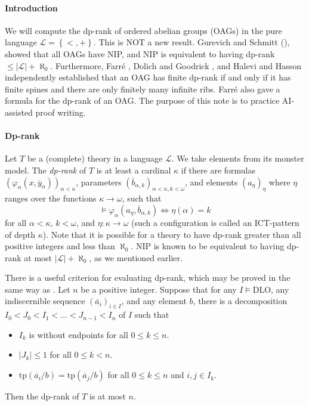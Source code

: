 \documentclass{article}
\title{}
\author{}
\date{}
\theoremstyle{definition}
\theoremstyle{remark}
\theoremstyle{plain}
\begin{document}


\paragraph{Introduction}

We will compute the dp-rank of ordered abelian groups (OAGs) in the pure language $\mathcal{L} = \left\{ <,+ \right\}$.
This is NOT a new result.
Gurevich and Schmitt (\cite{Gurevich1984TheOrd}), showed that all OAGs have NIP, and NIP is equivalent to having dp-rank $\leq |\mathcal{L}| + \aleph_0$.
Furthermore, Farré \cite{Farre2017StrOrd}, Dolich and Goodrick \cite{Dolich2018ChaStr}, and Halevi and Hasson \cite{Halevi2019StrDep} independently established that an OAG has finite dp-rank if and only if it has finite spines and there are only finitely many infinite ribs.
Farré also gave a formula for the dp-rank of an OAG.
The purpose of this note is to practice AI-assisted proof writing.

\paragraph{Dp-rank}

Let $T$ be a (complete) theory in a language $\mathcal{L}$.
We take elements from its monster model.
The \emph{dp-rank} of $T$ is at least a cardinal $\kappa$ if there are formulas $(\varphi_{\alpha}(x,\overline{y}_{\alpha}))_{\alpha < \kappa}$, parameters $(\overline{b}_{\alpha, k})_{\alpha < \kappa, k < \omega}$, and elements $(a_{\eta})_{\eta}$ where $\eta
$ ranges over the functions $\kappa \to \omega$, such that
\begin{equation*}
	\models \varphi_{\alpha}(a_{\eta}, \overline{b}_{\alpha, k}) \iff \eta(\alpha) = k
\end{equation*}
for all $\alpha < \kappa$, $k < \omega$, and $\eta: \kappa \to \omega$ (such a configuration is called an ICT-pattern of depth $\kappa$).
Note that it is possible for a theory to have dp-rank greater than all positive integers and less than $\aleph_0$.
NIP is known to be equivalent to having dp-rank at most $|\mathcal{L}| + \aleph_0$, as we mentioned earlier.

There is a useful criterion for evaluating dp-rank, which may be proved in the same way as \cite[Fact 2.10]{Dolich2011DpmBas}.
Let $n$ be a positive integer.
Suppose that for any $I \models \mathrm{DLO}$, any indiscernible sequence $(\overline{a}_i)_{i \in I}$, and any element $b$, there is a decomposition $I_0 < J_0 < I_1 < \dots < J_{n - 1} < I_n$ of $I$ such that
\begin{itemize}
	\item $I_k$ is without endpoints for all $0 \leq k \leq n$.
	\item $|J_k| \leq 1$ for all $0 \leq k < n$.
	\item $\mathrm{tp}(\overline{a}_i / b) = \mathrm{tp}(\overline{a}_j / b)$ for all $0 \leq k \leq n$ and $i, j \in I_k$.
\end{itemize}
Then the dp-rank of $T$ is at most $n$.
\end{document}
